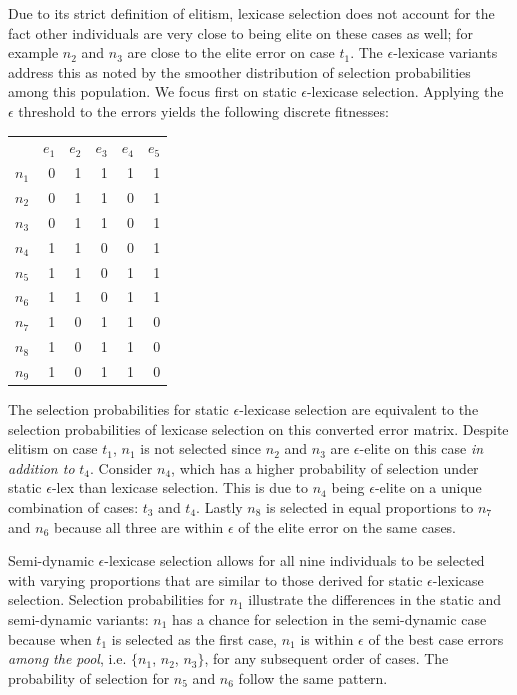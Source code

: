 \documentclass[twoside]{article}
\begin{document}
Due to its strict definition of elitism, lexicase selection does not account for the fact other individuals are very close to being elite on these cases as well; for example $n_2$ and $n_3$ are close to the elite error on case $t_1$. The $\epsilon$-lexicase variants address this as noted by the smoother distribution of selection probabilities among this population. We focus first on static $\epsilon$-lexicase selection. Applying the $\epsilon$ threshold to the errors yields the following discrete fitnesses:
\begin{center}
\begin{tabular}{lrrrrr}
& $e_1$ & $e_2$ & $e_3$ & $e_4$ & $e_5$ \\
$n_1$	&0	&	1	&	1	&	1	&	1\\ 
$n_2$	&0	&	1	&	1	&	0	&	1\\ 
$n_3$	&0	&	1	&	1	&	0	&	1\\ 
$n_4$	&1	&	1	&	0	&	0	&	1\\ 
$n_5$	&1	&	1	&	0	&	1	&	1\\ 
$n_6$	&1	&	1	&	0	&	1	&	1\\ 
$n_7$	&1	&	0	&	1	&	1	&	0\\ 
$n_8$	&1	&	0	&	1	&	1	&	0\\ 
$n_9$	&1	&	0	&	1	&	1	&	0\\ 
\end{tabular}
\end{center}

The selection probabilities for static $\epsilon$-lexicase selection are equivalent to the selection probabilities of lexicase selection on this converted error matrix. Despite elitism on case $t_1$, $n_1$ is not selected since $n_2$ and $n_3$ are $\epsilon$-elite on this case {\it in addition to} $t_4$. Consider $n_4$, which has a higher probability of selection under static $\epsilon$-lex than lexicase selection. This is due to $n_4$ being $\epsilon$-elite on a unique combination of cases: $t_3$ and $t_4$. Lastly $n_8$ is selected in equal proportions to $n_7$ and $n_6$ because all three are within $\epsilon$ of the elite error on the same cases. 

Semi-dynamic $\epsilon$-lexicase selection allows for all nine individuals to be selected with varying proportions that are similar to those derived for static $\epsilon$-lexicase selection. Selection probabilities for $n_1$ illustrate the differences in the static and semi-dynamic variants: $n_1$ has a chance for selection in the semi-dynamic case because when $t_1$ is selected as the first case, $n_1$ is within $\epsilon$ of the best case errors {\it among the pool}, i.e. $\{n_1$, $n_2$, $n_3\}$, for any subsequent order of cases. The probability of selection for $n_5$ and $n_6$ follow the same pattern.
\end{document}

